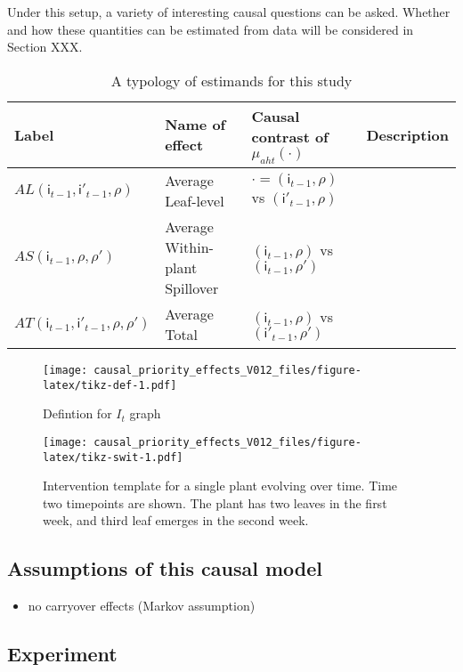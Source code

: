 \documentclass[]{article}
\providecommand{\tightlist}{%
  \setlength{\itemsep}{0pt}\setlength{\parskip}{0pt}}
\begin{document}
Under this setup, a variety of interesting causal questions can be
asked. Whether and how these quantities can be estimated from data will
be considered in Section XXX.

\begin{table}[H]
\caption{A typology of estimands for this study}
\label{tab:estimands}
\begin{tabular}{llll}
Label & Name of effect & Causal contrast of $\mu_{aht}(\cdot)$ & Description \\
\hline
$AL(\mathsf{i}_{t-1}, \mathsf{i}'_{t-1}, \rho)$ & Average Leaf-level &  $\cdot = (\mathsf{i}_{t-1}, \rho)$ vs $(\mathsf{i}'_{t-1}, \rho)$ & \\
$AS(\mathsf{i}_{t-1}, \rho, \rho')$ & Average Within-plant Spillover & $(\mathsf{i}_{t-1}, \rho)$ vs $(\mathsf{i}_{t-1}, \rho')$ & \\
$AT(\mathsf{i}_{t-1}, \mathsf{i}'_{t-1}, \rho, \rho')$  & Average Total & $(\mathsf{i}_{t-1}, \rho)$ vs $(\mathsf{i}'_{t-1}, \rho')$ & \\
\end{tabular}
\end{table}

\begin{figure}
\centering
\texttt{[image: causal\_priority\_effects\_V012\_files/figure-latex/tikz-def-1.pdf]}
\caption{Defintion for \(I_t\) graph}
\end{figure}

\begin{figure}
\centering
\texttt{[image: causal\_priority\_effects\_V012\_files/figure-latex/tikz-swit-1.pdf]}
\caption{Intervention template for a single plant evolving over time.
Time two timepoints are shown. The plant has two leaves in the first
week, and third leaf emerges in the second week.}
\end{figure}

\hypertarget{assumptions-of-this-causal-model}{%
\subsection{Assumptions of this causal
model}\label{assumptions-of-this-causal-model}}

\begin{itemize}
\tightlist
\item
  no carryover effects (Markov assumption)
\end{itemize}

\hypertarget{experiment}{%
\subsection{Experiment}\label{experiment}}
\end{document}
